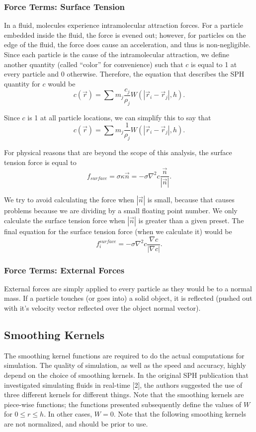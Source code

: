 \documentclass[a4paper,twocolumn]{article}
\begin{document}
\subsubsection{Force Terms: Surface Tension}
In a fluid, molecules experience intramolecular attraction forces. For a particle embedded inside the fluid, the force is evened out; however, for particles on the edge of the fluid, the force does cause an acceleration, and thus is non-negligible. Since each particle is the cause of the intramolecular attraction, we define another quantity (called ``color'' for convenience) such that $c$ is equal to 1 at every particle and 0 otherwise. Therefore, the equation that describes the SPH quantity for $c$ would be
\[c(\vec r) = \sum m_j \frac{c_j}{\rho_j} W(|\vec r_i - \vec r_j|, h).\]

Since $c$ is 1 at all particle locations, we can simplify this to say that
\[c(\vec r) = \sum m_j \frac{1}{\rho_j} W(|\vec r_i - \vec r_j|, h).\]

For physical reasons that are beyond the scope of this analysis, the surface tension force is equal to
\[f_{surface} = \sigma \kappa \vec n = -\sigma \nabla^2 c \frac{\vec n}{|\vec n|}.\]

We try to avoid calculating the force when $|\vec n|$ is small, because that causes problems because we are dividing by a small floating point number. We only calculate the surface tension force when $|\vec n|$ is greater than a given preset. The final equation for the surface tension force (when we calculate it) would be
\[f^{surface}_i = -\sigma \nabla^2 c \frac{\nabla c}{|\nabla c|}.\]

\subsubsection{Force Terms: External Forces}
External forces are simply applied to every particle as they would be to a normal mass. If a particle touches (or goes into) a solid object, it is reflected (pushed out with it's velocity vector reflected over the object normal vector).

\subsection{Smoothing Kernels}
The smoothing kernel functions are required to do the actual computations for simulation. The quality of simulation, as well as the speed and accuracy, highly depend on the choice of smoothing kernels. In the original SPH publication that investigated simulating fluids in real-time [2], the authors suggested the use of three different kernels for different things. Note that the smoothing kernels are piece-wise functions; the functions presented subsequently define the values of $W$ for $0 \leq r \leq h$. In other cases, $W = 0.$ Note that the following smoothing kernels are not normalized, and should be prior to use.
\end{document}
